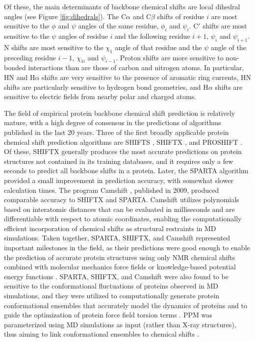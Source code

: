 \documentclass[9pt,review,pubversion]{livecoms}
\begin{document}
Of these, the main determinants of backbone chemical shifts are local dihedral angles (see Figure \ref{fig:dihedrals}).
The C$\alpha$ and C$\beta$ shifts of residue $i$ are most sensitive to the $\phi$ and $\psi$ angles of the same residue, $\phi_i$ and $\psi_i$.
C$'$ shifts are most sensitive to the $\psi$ angles of residue $i$ and the following residue $i+1$, $\psi_i$ and $\psi_{i+1}$.
N shifts are most sensitive to the $\chi_1$ angle of that residue and the $\psi$ angle of the preceding residue $i-1$, $\chi_{1i}$ and $\psi_{i-1}$.
Proton shifts are more sensitive to non-bonded interactions than are those of carbon and nitrogen atoms.
In particular, HN and H$\alpha$ shifts are very sensitive to the presence of aromatic ring currents, HN shifts are particularly sensitive to hydrogen bond geometries, and H$\alpha$ shifts are sensitive to electric fields from nearby polar and charged atoms.

The field of empirical protein backbone chemical shift prediction is relatively mature, with a high degree of consensus in the predictions of algorithms published in the last 20 years.
Three of the first broadly applicable protein chemical shift prediction algorithms are SHIFTS \cite{xu_automated_2001}, SHIFTX \cite{neal_rapid_2003}, and PROSHIFT \cite{meiler_proshift_2003}. Of these, SHIFTX generally produces the most accurate predictions on protein structures not contained in its training databases, and it requires only a few seconds to predict all backbone shifts in a protein.
Later, the SPARTA algorithm \cite{shen_protein_2007} provided a small improvement in prediction accuracy, with somewhat slower calculation times.
The program Camshift \cite{kohlhoff_fast_2009}, published in 2009, produced comparable accuracy to SHIFTX and SPARTA.
Camshift utilizes polynomials based on interatomic distances that can be evaluated in milliseconds and are differentiable with respect to atomic coordinates, enabling the computationally efficient incorporation of chemical shifts as structural restraints in MD simulations.
Taken together, SPARTA, SHIFTX, and Camshift represented important milestones in the field, as their predictions were good enough to enable the prediction of accurate protein structures using only NMR chemical shifts combined with molecular mechanics force fields or knowledge-based potential energy functions \cite{cavalli_protein_2007,shen_consistent_2008,wishart_cs23d_2008,robustelli_folding_2009,robustelli_using_2010}.
SPARTA, SHIFTX, and Camshift were also found to be sensitive to the conformational fluctuations of proteins observed in MD simulations, and they were utilized to computationally generate protein conformational ensembles that accurately model the dynamics of proteins \cite{li_certification_2010,markwick_enhanced_2010,robustelli_interpreting_2012,robustelli_conformational_2013} and to guide the optimization of protein force field torsion terms \cite{li_nmr-based_2010,robustelli_developing_2018}.
PPM was parameterized using MD simulations as input (rather than X-ray structures), thus aiming to link conformational ensembles to chemical shifts \cite{li_ppm_2012}.
\end{document}
